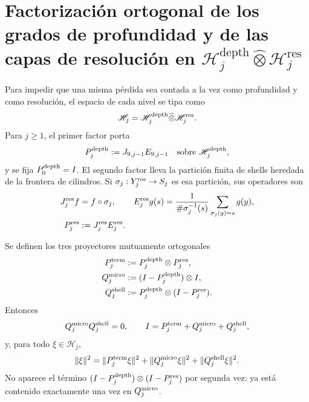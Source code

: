 \section{Factorización ortogonal de los grados de profundidad y de las capas de resolución en \(\mathscr H_j^{\mathrm{depth}}\widehat\otimes\mathscr H_j^{\mathrm{res}}\)}
\label{sec:pdfv2-sol-micro-shell}

Para impedir que una misma pérdida sea contada a la vez como profundidad y
como resolución, el espacio de cada nivel se tipa como
\begin{equation}\label{eq:pdfv2-sol-factor-hilbert}
 \mathscr H_j
 =\mathscr H_j^{\rm depth}\widehat\otimes
  \mathscr H_j^{\rm res}.
\end{equation}
Para \(j\geq1\), el primer factor porta
\[
 P_j^{\rm depth}:=J_{9,j-1}E_{9,j-1}
 \quad\text{sobre }\mathscr H_j^{\rm depth},
\]
y se fija \(P_0^{\rm depth}=I\). El segundo factor lleva la partición
finita de shells heredada de la frontera de cilindros.  Si
\(\sigma_j:Y_j^{\rm res}\to S_j\) es esa partición, sus operadores son
\begin{align}
 J_j^{\rm res}f&=f\circ\sigma_j,
 &E_j^{\rm res}g(s)&=
 \frac1{\#\sigma_j^{-1}(s)}
 \sum_{\sigma_j(y)=s}g(y),
 \label{eq:pdfv2-sol-shell-je}\\
 P_j^{\rm res}&:=J_j^{\rm res}E_j^{\rm res}.
 \label{eq:pdfv2-sol-shell-p}
\end{align}

Se definen los tres proyectores mutuamente ortogonales
\begin{align}
 P_j^{\rm term}
 &:=P_j^{\rm depth}\otimes P_j^{\rm res},
 \label{eq:pdfv2-sol-pterm}\\
 Q_j^{\rm micro}
 &:=(I-P_j^{\rm depth})\otimes I,
 \label{eq:pdfv2-sol-qmicro}\\
 Q_j^{\rm shell}
 &:=P_j^{\rm depth}\otimes(I-P_j^{\rm res}).
 \label{eq:pdfv2-sol-qshell}
\end{align}
Entonces
\begin{equation}\label{eq:pdfv2-sol-ortogonalidad}
 Q_j^{\rm micro}Q_j^{\rm shell}=0,
 \qquad
 I=P_j^{\rm term}+Q_j^{\rm micro}+Q_j^{\rm shell},
\end{equation}
y, para todo \(\xi\in\mathscr H_j\),
\begin{equation}\label{eq:pdfv2-sol-pitagoras}
 \|\xi\|^2
 =\|P_j^{\rm term}\xi\|^2
  +\|Q_j^{\rm micro}\xi\|^2
  +\|Q_j^{\rm shell}\xi\|^2.
\end{equation}
No aparece el término
\((I-P_j^{\rm depth})\otimes(I-P_j^{\rm res})\) por segunda vez: ya está
contenido exactamente una vez en \(Q_j^{\rm micro}\).

